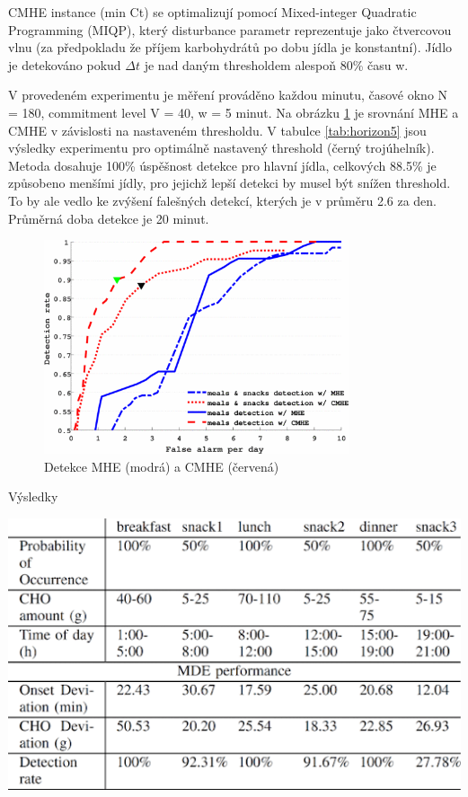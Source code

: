 CMHE instance (min Ct) se optimalizují pomocí Mixed-integer Quadratic Programming (MIQP), který disturbance parametr reprezentuje jako čtvercovou vlnu (za předpokladu že příjem karbohydrátů po dobu jídla je konstantní). Jídlo je detekováno pokud $\Delta t$ je nad daným thresholdem alespoň 80\% času w.

V provedeném experimentu je měření prováděno každou minutu, časové okno N = 180, commitment level V = 40, w = 5 minut. Na obrázku \ref{fig:horizon4} je srovnání MHE a CMHE v závislosti na nastaveném thresholdu.  V tabulce \ref{tab:horizon5} jsou výsledky experimentu pro optimálně nastavený threshold (černý trojúhelník). Metoda dosahuje 100\% úspěšnost detekce pro hlavní jídla, celkových 88.5\% je způsobeno menšími jídly, pro jejichž lepší detekci by musel být snížen threshold. To by ale vedlo ke zvýšení falešných detekcí, kterých je v průměru 2.6 za den. Průměrná doba detekce je 20 minut.

\begin{figure}[H]
\caption{Detekce MHE (modrá) a CMHE (červená)}
\label{fig:horizon4}
\centering
\includegraphics[width=0.8\textwidth]{img/analyza/horizon4.png}
\end{figure}

\begin{table}[H]
\caption{Výsledky}
\label{tab:horizon5}
\centering
\includegraphics[width=1\textwidth]{img/analyza/horizon5.png}
\end{table}


